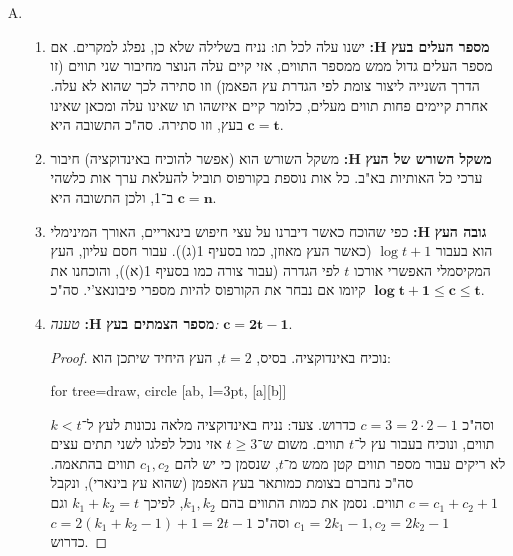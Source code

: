 \documentclass[]{article}
\begin{document}
	\section{}
	\begin{enumerate}[A.]
		\item \begin{enumerate}[i]
			\item \textbf{מספר העלים בעץ }$\bm{H}$\textbf{: }ישנו עלה לכל תו: נניח בשלילה שלא כן, נפלג למקרים. אם מספר העלים גדול ממש ממספר התווים, אזי קיים עלה הנוצר מחיבור שני תווים (זו הדרך השנייה ליצור צומת לפי הגדרת עץ הפאמן) וזו סתירה לכך שהוא לא עלה. אחרת קיימים פחות תווים מעלים, כלומר קיים איזשהו תו שאינו עלה ומכאן שאינו בעץ, וזו סתירה. סה"כ התשובה היא $\bm{c = t}$. 
			\item \textbf{משקל השורש של העץ }$\bm{H}$\textbf{: }משקל השורש הוא (אפשר להוכיח באינדוקציה) חיבור ערכי כל האותיות בא"ב. כל אות נוספת בקורפוס תוביל להעלאת ערך אות כלשהי ב־1, ולכן התשובה היא $\bm{c = n}$. 
			\item \textbf{גובה העץ }$\bm{H}$\textbf{: }כפי שהוכח כאשר דיברנו על עצי חיפוש בינאריים, האורך המינימלי הוא בעבור $\log t + 1$ (כאשר העץ מאוזן, כמו בסעיף 1(ג)). עבור חסם עליון, העץ המקיסמלי האפשרי אורכו $t$ לפי הגדרה (עבור צורה כמו בסעיף 1(א)), והוכחנו את קיומו אם נבחר את הקורפוס להיות מספרי פיבונאצ'י. סה"כ $\bm{\log t + 1 \le c \le t}$. 
			\item \textbf{מספר הצמתים בעץ }$\bm{H}$\textbf{: }\textit{טענה: }$\bm{c = 2t - 1}$.
			\begin{proof}נוכיח באינדוקציה. בסיס, $t = 2$, העץ היחיד שיתכן הוא: 
				\begin{center} \begin{forest}
						for tree={draw, circle}
						[ab, l=3pt, [a][b]]
				\end{forest} \end{center}			וסה"כ $c = 3 = 2 \cdot 2 - 1 $ כדרוש. צעד: נניח באינדוקציה מלאה נכונות לעץ ל־$k < t$ תווים, ונוכיח בעבור עץ ל־$t$ תווים. משום ש־$t \ge 3 $ אזי נוכל לפלגו לשני תתים עצים לא ריקים עבור מספר תווים קטן ממש מ־$t$, שנסמן כי יש להם $c_1, c_2 $ תווים בהתאמה. סה"כ נחברם בצומת כמותאר בעץ האפמן (שהוא עץ בינארי), ונקבל $c = c_1 + c_2 + 1 $ תווים. נסמן את כמות התווים בהם $k_1, k_2 $, לפיכך $k_1 + k_2 = t$ וגם $c_1 =2k_1 - 1, c_2 = 2k_2 - 1 $ וסה"כ $c = 2(k_1 + k_2 - 1) + 1 = 2t - 1 $ כדרוש. 
			\end{proof}
			

\end{enumerate}
\end{enumerate}
\end{document}
